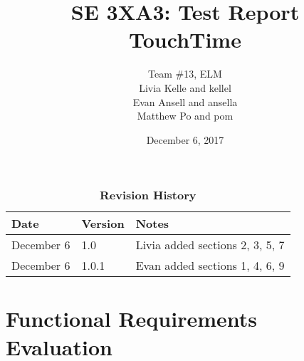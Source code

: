 \documentclass[12pt, titlepage]{article}
\title{SE 3XA3: Test Report\\TouchTime}
\author{Team \#13, ELM
		\\ Livia Kelle and kellel
		\\ Evan Ansell and ansella
		\\ Matthew Po and pom
}
\date{December 6, 2017}
\begin{document}
\maketitle

\tableofcontents
\listoftables
\listoffigures

\begin{table}[bp]
\caption{\bf Revision History}
\begin{tabularx}{\textwidth}{p{3cm}p{2cm}X}
\toprule {\bf Date} & {\bf Version} & {\bf Notes}\\
\midrule
December 6 & 1.0 & Livia added sections 2, 3, 5, 7\\
December 6 & 1.0.1 & Evan added sections 1, 4, 6, 9\\
\bottomrule
\end{tabularx}
\end{table}

\newpage


\section{Functional Requirements Evaluation}
\end{document}
